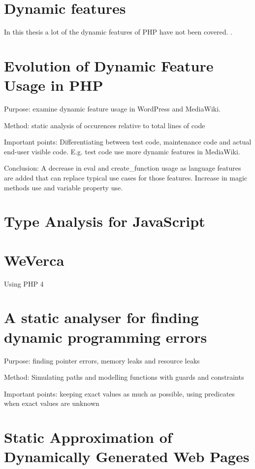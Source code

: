 \section{Dynamic features}
In this thesis a lot of the dynamic features of PHP have not been covered. .

\section{Evolution of Dynamic Feature Usage in PHP}
Purpose: examine dynamic feature usage in WordPress and MediaWiki.

Method: static analysis of occurences relative to total lines of code

Important points: Differentiating between test code, maintenance code and actual end-user visible code. E.g. test code use more dynamic features in MediaWiki.

Conclusion: A decrease in eval and create\_function usage as language features are added that can replace typical use cases for those features. Increase in magic methods use and variable property use.

\section{Type Analysis for JavaScript}

\section{WeVerca}
Using PHP 4

\section{A static analyser for finding dynamic programming errors}
Purpose: finding pointer errors, memory leaks and resource leaks

Method: Simulating paths and modelling functions with guards and constraints

Important points: keeping exact values as much as possible, using predicates when exact values are unknown

\section{Static Approximation of Dynamically Generated Web Pages}

